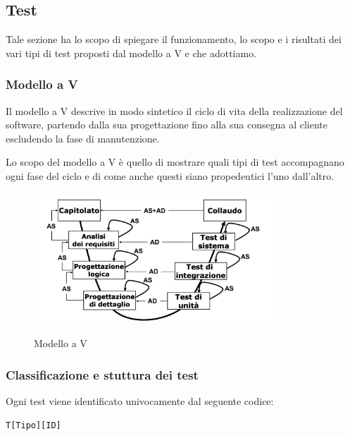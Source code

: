 \subsection{Test} \label{test}

Tale sezione ha lo scopo di spiegare il funzionamento, lo scopo e i risultati dei vari tipi di test proposti dal modello a V e che adottiamo.

\subsubsection{Modello a V} \label{sezionemodelloV}
Il modello a V descrive in modo sintetico il ciclo di vita della realizzazione del software, partendo dalla sua progettazione fino alla sua consegna al cliente escludendo la fase di manutenzione.

Lo scopo del modello a V è quello di mostrare quali tipi di test accompagnano ogni fase del ciclo e di come anche questi siano propedeutici l'uno dall'altro.

\begin{figure}[H]
	\centering
	\includegraphics[width=0.8\textwidth]{img/modellov-sweki_inv.png}
	\label{img:vmodel}
	\caption[Modello a V]{Modello a V\protect\footnotemark}
\end{figure}


\subsubsection{Classificazione e stuttura dei test} \label{classificazionetest}
Ogni test viene identificato univocamente dal seguente codice:

\begin{center}
	\texttt{T[Tipo][ID]}
\end{center}

